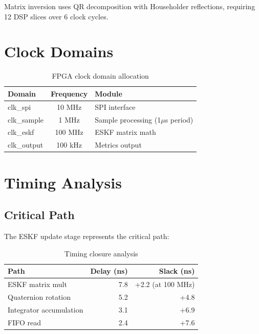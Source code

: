 Matrix inversion uses QR decomposition with Householder reflections, requiring 12 DSP slices over 6 clock cycles.

\section{Clock Domains}

\begin{table}[h]
    \centering
    \caption{FPGA clock domain allocation}
    \label{tab:clock_domains}
    \begin{tabular}{lcl}
        \toprule
        \textbf{Domain} & \textbf{Frequency} & \textbf{Module} \\
        \midrule
        clk\_spi & 10 MHz & SPI interface \\
        clk\_sample & 1 MHz & Sample processing (1$\mu$s period) \\
        clk\_eskf & 100 MHz & ESKF matrix math \\
        clk\_output & 100 kHz & Metrics output \\
        \bottomrule
    \end{tabular}
\end{table}

\section{Timing Analysis}

\subsection{Critical Path}

The ESKF update stage represents the critical path:

\begin{table}[h]
    \centering
    \caption{Timing closure analysis}
    \label{tab:timing}
    \begin{tabular}{lrr}
        \toprule
        \textbf{Path} & \textbf{Delay (ns)} & \textbf{Slack (ns)} \\
        \midrule
        ESKF matrix mult & 7.8 & +2.2 (at 100 MHz) \\
        Quaternion rotation & 5.2 & +4.8 \\
        Integrator accumulation & 3.1 & +6.9 \\
        FIFO read & 2.4 & +7.6 \\
        \bottomrule
    \end{tabular}
\end{table}

